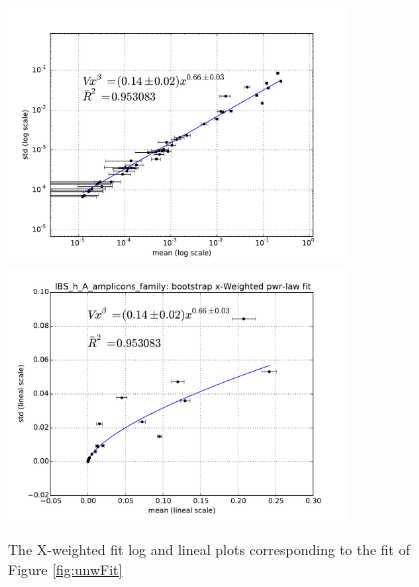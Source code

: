 \begin{figure}
	\centering
	\includegraphics[width=0.8\textwidth]{results/fits/IBS_h_A_amplicons_family_stdVSmean_xWboot_LOG.pdf}
	\includegraphics[width=0.8\textwidth]{results/fits/IBS_h_A_amplicons_family_stdVSmean_xWboot_LIN.pdf}
	\caption{The X-weighted fit log and lineal plots corresponding to the fit of Figure \ref{fig:unwFit}}
	\label{fig:X-wFit}
\end{figure}

